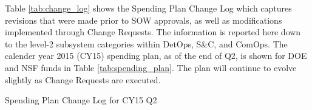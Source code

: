 Table \ref{tab:change_log} shows the Spending Plan Change Log which
captures revisions that were made prior to SOW approvals, as well as
modifications implemented through Change Requests.  The information is
reported here down to the level-2 subsystem categories within DetOps, S\&C,
and ComOps.
The calender year 2015 (CY15) spending plan, as of the end of Q2, is shown for DOE
and NSF funds in Table \ref{tab:spending_plan}.  The plan will
continue to evolve slightly as Change Requests are executed.

\begin{table}[hbtp]
  \begin{center}
    \caption{Spending Plan Change Log for CY15 Q2}
    \label{tab:change_log}
  \end{center}
\end{table}


